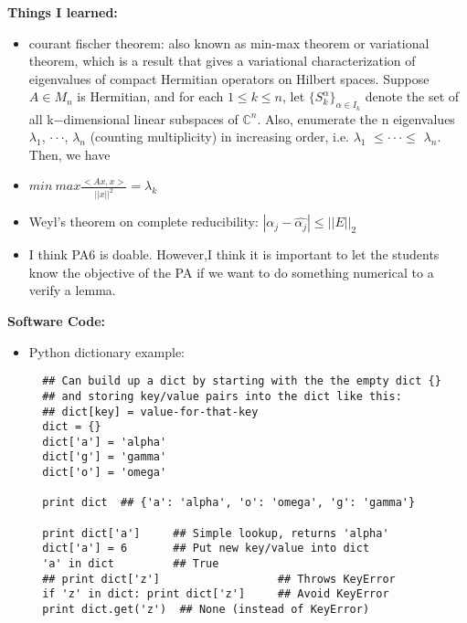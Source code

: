 \documentclass{article}
\begin{document}
\textbf{Things I learned:}
\begin{itemize}
\item courant fischer theorem: also known as min-max theorem or variational theorem, which  is a result that gives a variational characterization of eigenvalues of compact Hermitian operators on Hilbert spaces. Suppose $A \in M_n$ is Hermitian, and for each $1 \leq k \leq n$, let $\{ S_k^{\alpha} \}_{α\in I_k}$
denote the set of all k−dimensional linear subspaces of $\mathbb{C}^n$. Also, enumerate the n eigenvalues $\lambda_1$, $\cdot \cdot \cdot$, $\lambda_n$ (counting multiplicity) in increasing order, i.e. $\lambda_1$ $\leq \cdot \cdot \cdot \leq $ $\lambda_n$. Then, we have 
\item $min \ max \frac{<Ax,x>}{||x||^2} = \lambda _k$
\item Weyl's theorem on complete reducibility: $|\alpha_j-\hat{\alpha_j}| \leq ||E||_2 $     
\item I think PA6 is doable. However,I think it is important to let the students know the objective of the PA if we want to do something numerical to a verify a lemma.
\end{itemize}
\textbf{Software Code:}
\begin{itemize}
\item  Python dictionary example:
\begin{verbatim}
  ## Can build up a dict by starting with the the empty dict {}
  ## and storing key/value pairs into the dict like this:
  ## dict[key] = value-for-that-key
  dict = {}
  dict['a'] = 'alpha'
  dict['g'] = 'gamma'
  dict['o'] = 'omega'

  print dict  ## {'a': 'alpha', 'o': 'omega', 'g': 'gamma'}

  print dict['a']     ## Simple lookup, returns 'alpha'
  dict['a'] = 6       ## Put new key/value into dict
  'a' in dict         ## True
  ## print dict['z']                  ## Throws KeyError
  if 'z' in dict: print dict['z']     ## Avoid KeyError
  print dict.get('z')  ## None (instead of KeyError)
\end{verbatim}
\end{itemize}
\end{document}

